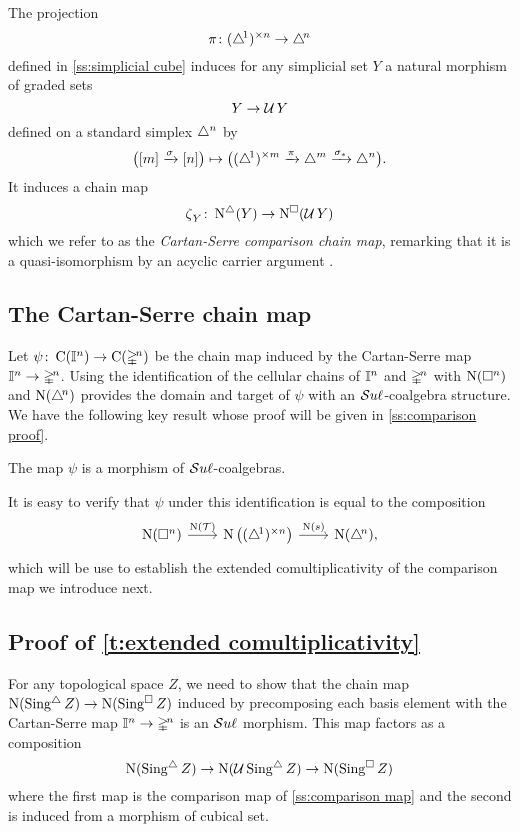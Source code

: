 The projection
\[
\operatorname{\pi} \colon (\triangle^{\!1})^{\times n} \to \triangle^{\!n}
\]
defined in \cref{ss:simplicial cube} induces for any simplicial set $Y$ a natural morphism of graded sets
\[
Y \to \operatorname{\mathcal{U}} Y
\]
defined on a standard simplex $\triangle^n$ by
\[
\big( [m] \xrightarrow{\sigma} [n] \big) \mapsto
\big( (\triangle^{\!1})^{\times m} \xrightarrow{\pi} \triangle^m \xrightarrow{\sigma_\ast} \triangle^n \big).
\]
It induces a chain map
\[
\operatorname{\zeta}_Y \colon \operatorname{N^{\triangle}}(Y) \to \operatorname{N^{\square}}(\operatorname{\mathcal{U}} Y)
\]
which we refer to as the \textit{Cartan-Serre comparison chain map}, remarking that it is a quasi-isomorphism by an acyclic carrier argument \cite{eilenberg1953acyclic}.

\subsection{The Cartan-Serre chain map} \label{ss:the cartan-serre chain map}

Let $\psi \colon \operatorname{C}(\mathbb{I}^n) \to \operatorname{C}(\mathbb{\Delta}^{\!n})$ be the chain map induced by the Cartan-Serre map $\mathbb{I}^n \to \mathbb{\Delta}^{\!n}$.
Using the identification of the cellular chains of $\mathbb{I}^n$ and $\mathbb{\Delta}^{\!n}$ with $\operatorname{N}(\square^n)$ and $\operatorname{N}(\triangle^{\!n})$
provides the domain and target of $\psi$ with an $\mathcal{S}u\ell$-coalgebra structure.
We have the following key result whose proof will be given in  \cref{ss:comparison proof}.

\begin{lemma} \label{l:cartan-serre is e infinity}
	The map $\psi$ is a morphism of $\mathcal{S}u\ell$-coalgebras.
\end{lemma}

It is easy to verify that $\psi$ under this identification is equal to the composition
\[
\begin{tikzcd}[column sep=normal]
\chains(\cube^n) \arrow[r, "\chains(\triangulate)"] &[-3pt]
\chains \big( \scube{n} \big) \arrow[r, "\chains(s)"] &[-3pt]
\chains(\simplex^{\!n}),
\end{tikzcd}
\]
which will be use to establish the extended comultiplicativity of the comparison map we introduce next.

\subsection{Proof of \cref{t:extended comultiplicativity}} \label{ss:proof extended comultiplicativity}

For any topological space $Z$, we need to show that the chain map $\operatorname{N}(\operatorname{Sing^{\triangle}} Z) \to \operatorname{N}(\operatorname{Sing^{\square}} Z)$ induced by precomposing each basis element with the Cartan-Serre map $\mathbb{I}^n \to \mathbb{\Delta}^{\!n}$ is an $\mathcal{S}u\ell$ morphism.
This map factors as a composition
\[
\operatorname{N}(\operatorname{Sing^{\triangle}} Z) \to \operatorname{N}(\operatorname{\mathcal{U}} \operatorname{Sing^{\triangle}} Z) \to \operatorname{N}(\operatorname{Sing^{\square}} Z)
\]
where the first map is the comparison map of \cref{ss:comparison map} and the second is induced from a morphism of cubical set.

